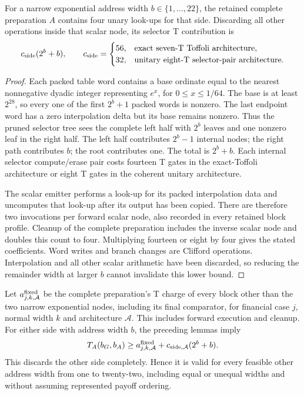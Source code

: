 \begin{lemma}
\label{lem:raw-asymmetric-one-side-selector}
For a narrow exponential address width $b\in\{1,\ldots,22\}$,
the retained complete preparation $A$ contains four unary look-ups for
that side. Discarding all other operations inside that scalar node, its
selector T contribution is
\begin{equation}
 c_{\rm side}(2^b+b),\qquad
 c_{\rm side}=\begin{cases}
 56,&\text{exact seven-T Toffoli architecture},\\
 32,&\text{unitary eight-T selector-pair architecture}.
 \end{cases}
\end{equation}
\end{lemma}
\begin{proof}
Each packed table word contains a base ordinate equal to the nearest
nonnegative dyadic integer representing $e^x$, for $0\leq x\leq1/64$.
The base is at least $2^{28}$, so every one of the first $2^b+1$
packed words is nonzero. The last endpoint word has a zero interpolation
delta but its base remains nonzero. Thus the pruned selector tree sees
the complete left half with $2^b$ leaves and one nonzero leaf in the
right half. The left half contributes $2^b-1$ internal nodes; the
right path contributes $b$; the root contributes one. The total is
$2^b+b$. Each internal selector compute/erase pair costs fourteen T
gates in the exact-Toffoli architecture or eight T gates in the coherent
unitary architecture.

The scalar emitter performs a look-up for its packed interpolation data
and uncomputes that look-up after its output has been copied. There
are therefore two invocations per forward scalar node, also recorded
in every retained block profile. Cleanup of the complete preparation
includes the inverse scalar node and doubles this count to four.
Multiplying fourteen or eight by four gives the stated coefficients.
Word writes and branch changes are Clifford operations. Interpolation
and all other scalar arithmetic have been discarded, so reducing the
remainder width at larger $b$ cannot invalidate this lower bound.
\end{proof}

Let $a^{\rm fixed}_{j,k,\mathcal A}$ be the complete preparation's
T charge of every block other than the two narrow exponential nodes,
including its final comparator, for financial case $j$, normal width
$k$ and architecture $\mathcal A$. This includes forward execution
and cleanup. For either side with address width $b$, the preceding
lemmas imply
\begin{equation}
 T_A(b_G,b_A)\geq a^{\rm fixed}_{j,k,\mathcal A}
                         +c_{\rm side,\mathcal A}(2^b+b).
\label{eq:raw-asymmetric-one-side-A-floor}
\end{equation}
This discards the other side completely. Hence it is valid for every
feasible other address width from one to twenty-two, including equal
or unequal widths and without assuming represented payoff ordering.

